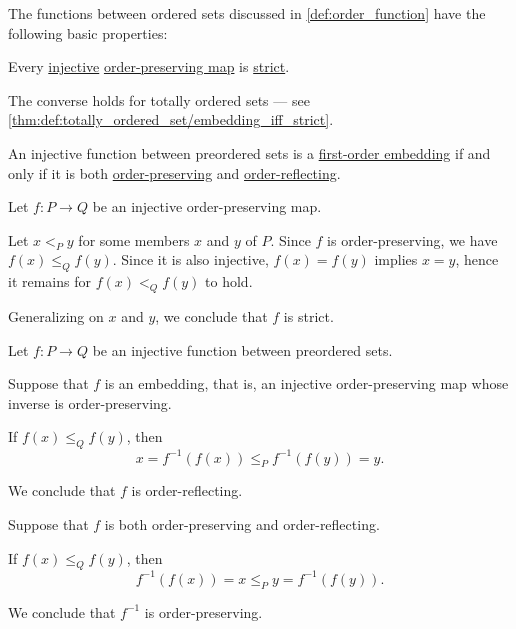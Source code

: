 \begin{proposition}\label{thm:def:order_function}
  The functions between ordered sets discussed in \cref{def:order_function} have the following basic properties:
  \begin{thmenum}
     Every \hyperref[def:function_invertibility/injective]{injective} \hyperref[def:order_function/preserving]{order-preserving map} is \hyperref[def:order_function/preserving]{strict}.

    The converse holds for totally ordered sets --- see \cref{thm:def:totally_ordered_set/embedding_iff_strict}.

     An injective function between preordered sets is a \hyperref[def:fol_embedding]{first-order embedding} if and only if it is both \hyperref[def:order_function/preserving]{order-preserving} and \hyperref[def:order_function/preserving]{order-reflecting}.
  \end{thmenum}
\end{proposition}
\begin{defproof}
   Let \( f: P \to Q \) be an injective order-preserving map.

  Let \( x <_P y \) for some members \( x \) and \( y \) of \( P \). Since \( f \) is order-preserving, we have \( f(x) \leq_Q f(y) \). Since it is also injective, \( f(x) = f(y) \) implies \( x = y \), hence it remains for \( f(x) <_Q f(y) \) to hold.

  Generalizing on \( x \) and \( y \), we conclude that \( f \) is strict.

   Let \( f: P \to Q \) be an injective function between preordered sets.

  \SufficiencySubProof* Suppose that \( f \) is an embedding, that is, an injective order-preserving map whose inverse is order-preserving.

  If \( f(x) \leq_Q f(y) \), then
  \begin{equation*}
    x = f^{-1}(f(x)) \leq_P f^{-1}(f(y)) = y.
  \end{equation*}

  We conclude that \( f \) is order-reflecting.

  \NecessitySubProof* Suppose that \( f \) is both order-preserving and order-reflecting.

  If \( f(x) \leq_Q f(y) \), then
  \begin{equation*}
    f^{-1}(f(x)) = x \leq_P y = f^{-1}(f(y)).
  \end{equation*}

  We conclude that \( f^{-1} \) is order-preserving.
\end{defproof}
